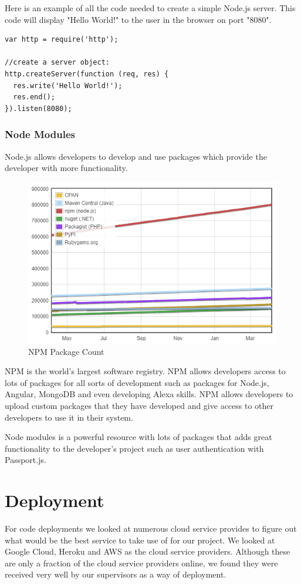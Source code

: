 Here is an example of all the code needed to create a simple Node.js server. This code will display "Hello World!" to the user in the browser on port "8080".
\begin{verbatim}
var http = require('http');

//create a server object:
http.createServer(function (req, res) {
  res.write('Hello World!');
  res.end();
}).listen(8080);
\end{verbatim}

\subsubsection{Node Modules}
Node.js allows developers to develop and use packages which provide the developer with more functionality.

\begin{figure}[H]
  \includegraphics[width=\linewidth]{img/moduleCount.PNG}
  \caption{NPM Package Count}
  \label{fig:NPM}
\end{figure}

NPM is the world’s largest software registry. NPM allows developers access to lots of packages for all sorts of development such as packages for Node.js, Angular, MongoDB and even developing Alexa skills. NPM allows developers to upload custom packages that they have developed and give access to other developers to use it in their system.

Node modules is a powerful resource with lots of packages that adds great functionality to the developer's project such as user authentication with Passport.js.


\section{Deployment}
For code deployments we looked at numerous cloud service provides to figure out what would be the best service to take use of for our project. We looked at Google Cloud, Heroku and AWS as the cloud service providers. Although these are only a fraction of the cloud service providers online, we found they were received very well by our supervisors as a way of deployment. 

